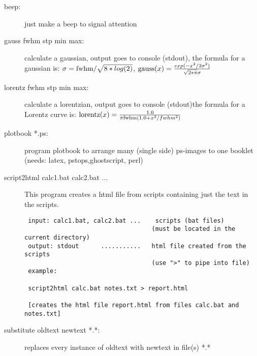 \begin{description}
\item [\prg beep:] just make a beep to signal attention 
\item [\prg gauss fwhm stp min max:] calculate a gaussian, output goes to console %
(stdout), the formula for a gaussian is:
$\sigma={\rm fwhm}/\sqrt{8*log(2)}$,
${\rm gauss}(x)=\frac{exp(-x^2/2 \sigma^2)}{\sqrt{2*\pi}\sigma}$
\item [\prg lorentz fwhm stp min max:] calculate a lorentzian, output goes to %
console (stdout)the formula for a Lorentz curve is: 
${\rm lorentz}(x)=\frac{1.0}{\pi{\rm fwhm}(1.0+x^2/fwhm^2)}$
\item [\prg plotbook *.ps:] program plotbook to arrange many (single side) ps-images to one %
booklet (needs: latex, pstops,ghostscript, perl)
\item [\prg script2html calc1.bat calc2.bat ...] This program creates a html file from scripts containing just the text
 in the scripts.
\begin{verbatim}
 input: calc1.bat, calc2.bat ...    scripts (bat files)
                                   (must be located in the current directory)
 output: stdout      ...........   html file created from the scripts
                                   (use ">" to pipe into file)
 example:

 script2html calc.bat notes.txt > report.html

 [creates the html file report.html from files calc.bat and notes.txt]
\end{verbatim}
\item [\prg substitute oldtext newtext *.*:] replaces every instance of %
oldtext with newtext in file(s) *.*
\end{description}


